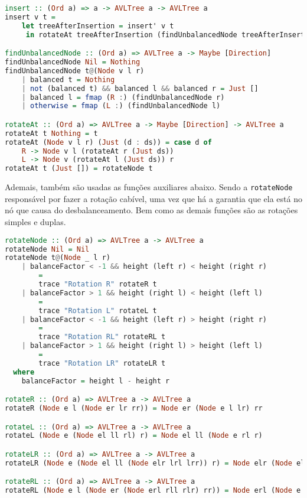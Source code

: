 \begin{lstlisting}[language=haskell]
insert :: (Ord a) => a -> AVLTree a -> AVLTree a
insert v t =
    let treeAfterInsertion = insert' v t
     in rotateAt treeAfterInsertion (findUnbalancedNode treeAfterInsertion)

findUnbalancedNode :: (Ord a) => AVLTree a -> Maybe [Direction]
findUnbalancedNode Nil = Nothing
findUnbalancedNode t@(Node v l r)
    | balanced t = Nothing
    | not (balanced t) && balanced l && balanced r = Just []
    | balanced l = fmap (R :) (findUnbalancedNode r)
    | otherwise = fmap (L :) (findUnbalancedNode l)

rotateAt :: (Ord a) => AVLTree a -> Maybe [Direction] -> AVLTree a
rotateAt t Nothing = t
rotateAt (Node v l r) (Just (d : ds)) = case d of
    R -> Node v l (rotateAt r (Just ds))
    L -> Node v (rotateAt l (Just ds)) r
rotateAt t (Just []) = rotateNode t
\end{lstlisting}

Ademais, também são usadas as funções auxiliares abaixo. Sendo a \texttt{rotateNode} responsável por fazer a rotação cabível, uma vez que há a garantia que ela está no nó que causa do desbalanceamento. Bem como as demais funções são as rotações simples e duplas.

\begin{lstlisting}[language=haskell]
rotateNode :: (Ord a) => AVLTree a -> AVLTree a
rotateNode Nil = Nil
rotateNode t@(Node _ l r)
    | balanceFactor < -1 && height (left r) < height (right r)
        =
        trace "Rotation R" rotateR t
    | balanceFactor > 1 && height (right l) < height (left l)
        =
        trace "Rotation L" rotateL t
    | balanceFactor < -1 && height (left r) > height (right r)
        =
        trace "Rotation RL" rotateRL t
    | balanceFactor > 1 && height (right l) > height (left l)
        =
        trace "Rotation LR" rotateLR t
  where
    balanceFactor = height l - height r

rotateR :: (Ord a) => AVLTree a -> AVLTree a
rotateR (Node e l (Node er lr rr)) = Node er (Node e l lr) rr

rotateL :: (Ord a) => AVLTree a -> AVLTree a
rotateL (Node e (Node el ll rl) r) = Node el ll (Node e rl r)

rotateLR :: (Ord a) => AVLTree a -> AVLTree a
rotateLR (Node e (Node el ll (Node elr lrl lrr)) r) = Node elr (Node el ll lrl) (Node e lrr r)

rotateRL :: (Ord a) => AVLTree a -> AVLTree a
rotateRL (Node e l (Node er (Node erl rll rlr) rr)) = Node erl (Node e l rll) (Node er rlr rr)
\end{lstlisting}

